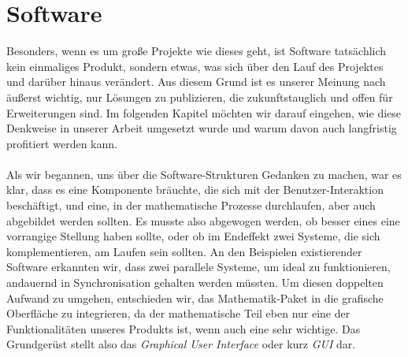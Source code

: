 \section{Software}
Besonders, wenn es um große Projekte wie dieses geht, ist Software tatsächlich kein einmaliges Produkt, sondern etwas, was sich über den Lauf des Projektes und darüber hinaus verändert. Aus diesem Grund ist es unserer Meinung nach äußerst wichtig, nur Lösungen zu publizieren, die zukunftstauglich und offen für Erweiterungen sind. Im folgenden Kapitel möchten wir darauf eingehen, wie diese Denkweise in unserer Arbeit umgesetzt wurde und warum davon auch langfristig profitiert werden kann.\\
\\
Als wir begannen, uns über die Software-Strukturen Gedanken zu machen, war es klar, dass es eine Komponente bräuchte, die sich mit der Benutzer-Interaktion beschäftigt, und eine, in der mathematische Prozesse durchlaufen, aber auch abgebildet werden sollten. Es musste also abgewogen werden, ob besser eines eine vorrangige Stellung haben sollte, oder ob im Endeffekt zwei Systeme, die sich komplementieren, am Laufen sein sollten. An den Beispielen existierender Software erkannten wir, dass zwei parallele Systeme, um ideal zu funktionieren, andauernd in Synchronisation gehalten werden müssten. Um diesen doppelten Aufwand zu umgehen, entschieden wir, das Mathematik-Paket in die grafische Oberfläche zu integrieren, da der mathematische Teil eben nur eine der Funktionalitäten unseres Produkts ist, wenn auch eine sehr wichtige. Das Grundgerüst stellt also das \textit{Graphical User Interface} oder kurz \textit{GUI} dar.







